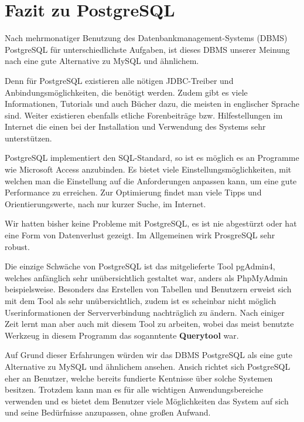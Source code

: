 \section{Fazit zu PostgreSQL}
Nach mehrmonatiger Benutzung des Datenbankmanagement-Systems (DBMS) PostgreSQL für 
unterschiedlichste Aufgaben, ist dieses DBMS unserer Meinung nach eine gute Alternative zu MySQL 
und ähnlichem. 

Denn für PostgreSQL existieren alle nötigen JDBC-Treiber und Anbindungsmöglichkeiten, die benötigt 
werden. Zudem gibt es viele Informationen, Tutorials und auch Bücher dazu, die meisten in englischer 
Sprache sind. Weiter existieren ebenfalls etliche Forenbeiträge bzw.
Hilfestellungen im Internet die einen bei der Installation und Verwendung des
Systems sehr unterstützen.

PostgreSQL implementiert den SQL-Standard, so ist es möglich es an Programme wie
Microsoft Access anzubinden. Es bietet viele Einstellungsmöglichkeiten, mit
welchen man die Einstellung auf die Anforderungen anpassen kann, um eine gute
Performance zu erreichen. Zur Optimierung findet man viele Tipps und
Orientierungswerte, nach nur kurzer Suche, im Internet.

Wir hatten bisher keine Probleme mit PostgreSQL, es ist nie abgestürzt oder hat eine Form von 
Datenverlust gezeigt. Im Allgemeinen wirk ProsgreSQL sehr robust.

Die einzige Schwäche von PostgreSQL ist das mitgelieferte Tool pgAdmin4, welches
anfänglich sehr unübersichtlich gestaltet war, anders als PhpMyAdmin beispielsweise. Besonders
das Erstellen von Tabellen und Benutzern erweist sich mit dem Tool als sehr
unübersichtlich, zudem ist es scheinbar nicht möglich Userinformationen der
Serververbindung nachträglich zu ändern. Nach einiger Zeit lernt man aber auch
mit diesem Tool zu arbeiten, wobei das meist benutzte Werkzeug in diesem
Programm das soganntente \textbf{Querytool} war.
   
Auf Grund dieser Erfahrungen würden wir das DBMS PostgreSQL als eine gute
Alternative zu MySQL und ähnlichem ansehen. Ansich richtet sich PostgreSQL eher
an Benutzer, welche bereits fundierte Kentnisse über solche Systemen
besitzen. Trotzdem kann man es für alle wichtigen Anwendungsbereiche
verwenden und es bietet dem Benutzer viele Möglichkeiten das System auf sich
und seine Bedürfnisse anzupassen, ohne großen Aufwand.


\clearpage